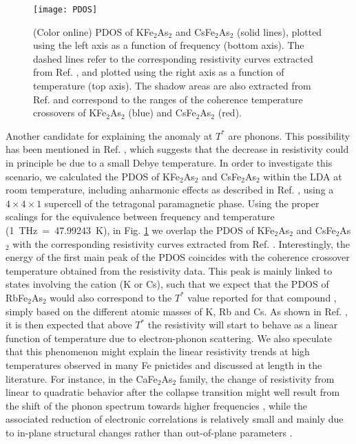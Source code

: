 \documentclass[twocolumn,aps,showpacs,preprintnumbers,amsmath,amssymb, superscriptaddress,longbibliography]{revtex4-1}
\begin{document}
\begin{figure}[!t]
\begin{center}
\texttt{[image: PDOS]}
\end{center}
\caption{\label{PDOS}(Color online) PDOS of KFe$_2$As$_2$ and CsFe$_2$As$_2$ (solid lines), plotted using the left axis as a function of frequency (bottom axis). The dashed lines refer to the corresponding resistivity curves extracted from Ref. \cite{YP_Wu_PRL116}, and plotted using the right axis as a function of temperature (top axis). The shadow areas are also extracted from Ref. \cite{YP_Wu_PRL116} and correspond to the ranges of the coherence temperature crossovers of KFe$_2$As$_2$ (blue) and CsFe$_2$As$_2$ (red).} 
\end{figure}


Another candidate for explaining the anomaly at $T^*$ are phonons. This possibility has been mentioned in Ref. \cite{Wiecki_PRB97}, which suggests that the decrease in resistivity could in principle be due to a small Debye temperature. In order to investigate this scenario, we calculated the PDOS of KFe$_2$As$_2$ and CsFe$_2$As$_2$ within the LDA at room temperature, including anharmonic effects as described in Ref. \cite{vanRoekeghem_PRB94}, using a $4\times 4\times 1$ supercell of the tetragonal paramagnetic phase. Using the proper scalings for the equivalence between frequency and temperature (1~THz~=~47.99243~K), in Fig. \ref{PDOS} we overlap the PDOS of KFe$_2$As$_2$ and CsFe$_2$As$_2$ with the corresponding resistivity curves extracted from Ref. \cite{YP_Wu_PRL116}. Interestingly, the energy of the first main peak of the PDOS coincides with the coherence crossover temperature obtained from the resistivity data. This peak is mainly linked to states involving the cation (K or Cs), such that we expect that the PDOS of RbFe$_2$As$_2$ would also correspond to the $T^*$ value reported for that compound \cite{YP_Wu_PRL116}, simply based on the different atomic masses of K, Rb and Cs. As shown in Ref. \cite{Allan_PRB17}, it is then expected that above $T^*$ the resistivity will start to behave as a linear function of temperature due to electron-phonon scattering. We also speculate that this phenomenon might explain the linear resistivity trends at high temperatures observed in many Fe pnictides and discussed at length in the literature. For instance, in the CaFe$_2$As$_2$ family, the change of resistivity from linear to quadratic behavior after the collapse transition might well result from the shift of the phonon spectrum towards higher frequencies \cite{Mittal_PRB81}, while the associated reduction of electronic correlations is relatively small and mainly due to in-plane structural changes rather than out-of-plane parameters \cite{vanRoekeghem_PRB93}.
\end{document}
